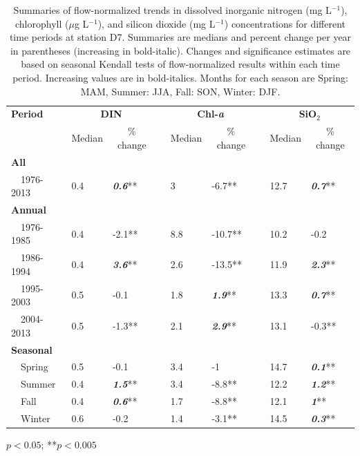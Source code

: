\documentclass[letterpaper,12pt,oneside]{article}\usepackage[]{graphicx}\usepackage[]{color}
\begin{document}
\begin{table}[!tbp]
\caption{Summaries of flow-normalized trends in dissolved inorganic nitrogen (mg L$^{-1}$), chlorophyll ($\mu$g L$^{-1}$), and silicon dioxide (mg L$^{-1}$) concentrations for different time periods at station D7. Summaries are  medians and percent change per year in parentheses (increasing in bold-italic).  Changes and significance estimates are based on seasonal Kendall tests of flow-normalized results within each time period. Increasing values are in bold-italics. Months for each season are Spring: MAM, Summer: JJA, Fall: SON, Winter: DJF.\label{tab:d7chg}} 
\begin{center}
\begin{tabular}{lllcllcll}
\hline\hline
\multicolumn{1}{l}{\bfseries Period}&\multicolumn{2}{c}{\bfseries DIN}&\multicolumn{1}{c}{\bfseries }&\multicolumn{2}{c}{\bfseries Chl-\textit{a}}&\multicolumn{1}{c}{\bfseries }&\multicolumn{2}{c}{\bfseries SiO$_2$}\tabularnewline
\cline{2-3} \cline{5-6} \cline{8-9}
\multicolumn{1}{l}{}&\multicolumn{1}{c}{Median}&\multicolumn{1}{c}{\% change}&\multicolumn{1}{c}{}&\multicolumn{1}{c}{Median}&\multicolumn{1}{c}{\% change}&\multicolumn{1}{c}{}&\multicolumn{1}{c}{Median}&\multicolumn{1}{c}{\% change}\tabularnewline
\hline
{\bfseries All}&&&&&&&&\tabularnewline
~~1976-2013&0.4&\textit{\textbf{0.6}}**&&3&-6.7**&&12.7&\textit{\textbf{0.7}}**\tabularnewline
\hline
{\bfseries Annual}&&&&&&&&\tabularnewline
~~1976-1985&0.4&-2.1**&&8.8&-10.7**&&10.2&-0.2\tabularnewline
~~1986-1994&0.4&\textit{\textbf{3.6}}**&&2.6&-13.5**&&11.9&\textit{\textbf{2.3}}**\tabularnewline
~~1995-2003&0.5&-0.1&&1.8&\textit{\textbf{1.9}}**&&13.3&\textit{\textbf{0.7}}**\tabularnewline
~~2004-2013&0.5&-1.3**&&2.1&\textit{\textbf{2.9}}**&&13.1&-0.3**\tabularnewline
\hline
{\bfseries Seasonal}&&&&&&&&\tabularnewline
~~Spring&0.5&-0.1&&3.4&-1&&14.7&\textit{\textbf{0.1}}**\tabularnewline
~~Summer&0.4&\textit{\textbf{1.5}}**&&3.4&-8.8**&&12.2&\textit{\textbf{1.2}}**\tabularnewline
~~Fall&0.4&\textit{\textbf{0.6}}**&&1.7&-8.8**&&12.1&\textit{\textbf{1}}**\tabularnewline
~~Winter&0.6&-0.2&&1.4&-3.1**&&14.5&\textit{\textbf{0.3}}**\tabularnewline
\hline
\end{tabular}\end{center}

\footnotesize *$p<0.05$; **$p<0.005$\end{table}
\end{document}
